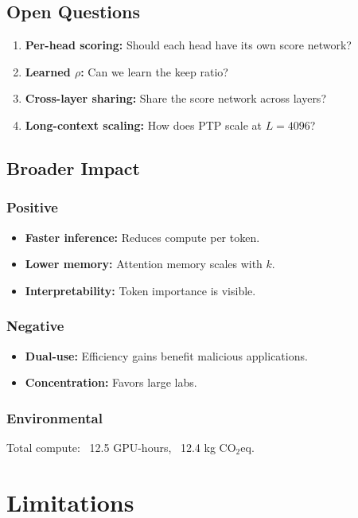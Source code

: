 {\subsection{Open Questions}

\begin{enumerate}
\item \textbf{Per-head scoring:} Should each head have its own score network?
\item \textbf{Learned $\rho$:} Can we learn the keep ratio?
\item \textbf{Cross-layer sharing:} Share the score network across layers?
\item \textbf{Long-context scaling:} How does PTP scale at $L = 4096$?

\end{enumerate}
\subsection{Broader Impact}

\subsubsection{Positive}
\begin{itemize}
\item \textbf{Faster inference:} Reduces compute per token.
\item \textbf{Lower memory:} Attention memory scales with $k$.
\item \textbf{Interpretability:} Token importance is visible.

\end{itemize}
\subsubsection{Negative}
\begin{itemize}
\item \textbf{Dual-use:} Efficiency gains benefit malicious applications.
\item \textbf{Concentration:} Favors large labs.

\end{itemize}
\subsubsection{Environmental}
Total compute: ~12.5 GPU-hours, ~12.4 kg CO$_2$eq.




\section{Limitations}

}
